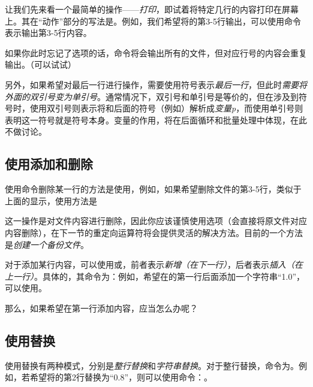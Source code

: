 让我们先来看一个最简单的操作——\emph{打印}，即试着将特定几行的内容打印在屏幕上。其在“动作”部分的写法是。例如，我们希望将的第3-5行输出，可以使用命令表示输出第3-5行内容。

\begin{extend}
    如果你此时忘记了选项的话，命令将会输出所有的文件，但对应行号的内容会重复输出。（可以试试）

    另外，如果希望对最后一行进行操作，需要使用\code{\$}符号表示\emph{最后一行}，但此时\emph{需要将外面的双引号变为单引号}。通常情况下，双引号和单引号是等价的，但在涉及到\code{\$}符号时，使用双引号则表示将\code{\$}和后面的符号（例如）解析成\emph{变量p}，而使用单引号则表明这一符号就是符号本身。变量的作用，将在后面循环和批量处理中体现，在此不做讨论。
\end{extend}

\subsection{使用添加和删除}\label{subsec:sed文本替换-使用sed添加和删除}

使用命令删除某一行的方法是使用，例如，如果希望删除文件的第3-5行，类似于上面的显示，使用方法是

\begin{attention}
    这一操作是对文件内容进行删除，因此你应该谨慎使用选项（会直接将原文件对应内容删除），在下一节的重定向运算符将会提供灵活的解决方法。目前的一个方法是\emph{创建一个备份文件}。
\end{attention}

对于添加某行内容，可以使用或，前者表示\emph{新增（在下一行）}，后者表示\emph{插入（在上一行）}。具体的，其命令为：例如，希望在的第一行后面添加一个字符串“1.0”，可以使用。

那么，如果希望在第一行添加内容，应当怎么办呢？


\subsection{使用替换}\label{subsec:sed文本替换-使用sed替换}

使用替换有两种模式，分别是\emph{整行替换}和\emph{字符串替换}。对于整行替换，命令为。例如，若希望将的第2行替换为“0.8”，则可以使用命令：。

